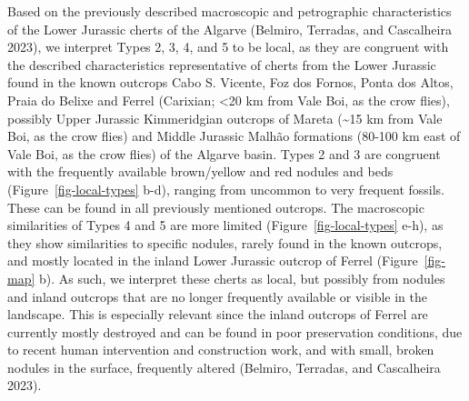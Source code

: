 \documentclass[
  a4paper,
  DIV=11,
  numbers=noendperiod]{scrreprt}
\begin{document}
Based on the previously described macroscopic and petrographic
characteristics of the Lower Jurassic cherts of the Algarve (Belmiro,
Terradas, and Cascalheira 2023), we interpret Types 2, 3, 4, and 5 to be
local, as they are congruent with the described characteristics
representative of cherts from the Lower Jurassic found in the known
outcrops Cabo S. Vicente, Foz dos Fornos, Ponta dos Altos, Praia do
Belixe and Ferrel (Carixian; \textless20 km from Vale Boi, as the crow
flies), possibly Upper Jurassic Kimmeridgian outcrops of Mareta
(\textasciitilde15 km from Vale Boi, as the crow flies) and Middle
Jurassic Malhão formations (80-100 km east of Vale Boi, as the crow
flies) of the Algarve basin. Types 2 and 3 are congruent with the
frequently available brown/yellow and red nodules and beds
(Figure~\ref{fig-local-types} b-d), ranging from uncommon to very
frequent fossils. These can be found in all previously mentioned
outcrops. The macroscopic similarities of Types 4 and 5 are more limited
(Figure~\ref{fig-local-types} e-h), as they show similarities to
specific nodules, rarely found in the known outcrops, and mostly located
in the inland Lower Jurassic outcrop of Ferrel (Figure~\ref{fig-map} b).
As such, we interpret these cherts as local, but possibly from nodules
and inland outcrops that are no longer frequently available or visible
in the landscape. This is especially relevant since the inland outcrops
of Ferrel are currently mostly destroyed and can be found in poor
preservation conditions, due to recent human intervention and
construction work, and with small, broken nodules in the surface,
frequently altered (Belmiro, Terradas, and Cascalheira 2023).
\end{document}

